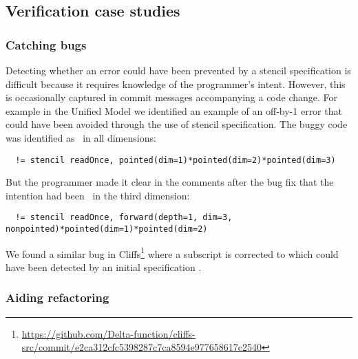 \subsection{Verification case studies}
\label{sec:case-studies}

\subsubsection{Catching bugs}

Detecting whether an error could have been prevented by a stencil
specification is difficult because it requires knowledge of the
programmer's intent. However, this is occasionally captured in commit
messages accompanying a code change. For example in the Unified Model
we identified an example of an off-by-1 error that could have been
avoided through the use of stencil specification. The buggy code was
identified as \pointed\ in all dimensions:

\begin{verbatim}
  != stencil readOnce, pointed(dim=1)*pointed(dim=2)*pointed(dim=3)
\end{verbatim}

But the programmer made it clear in the comments after the bug fix
that the intention had been \forward\ in the third dimension:

\begin{verbatim}
  != stencil readOnce, forward(depth=1, dim=3, nonpointed)*pointed(dim=1)*pointed(dim=2)
\end{verbatim}
%
We found a similar bug in 
Cliffs\footnote{\url{https://github.com/Delta-function/cliffs-src/commit/e2ca312cfc5398287c7ca8594e977658617c2540}}
where a subscript  is corrected to  which
could have been detected by an initial specification .


\subsubsection{Aiding refactoring}


